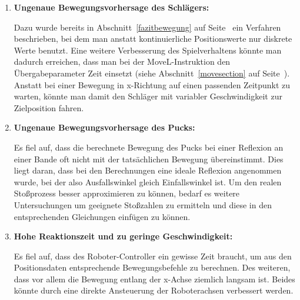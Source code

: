\begin{enumerate}
\item \textbf{Ungenaue Bewegungsvorhersage des Schlägers:} 

Dazu wurde bereits in Abschnitt~\ref{fazitbewegung} auf Seite~\pageref{fazitbewegung} ein Verfahren beschrieben, bei dem man anstatt kontinuierliche Positionswerte nur diskrete Werte benutzt. 
Eine weitere Verbesserung des Spielverhaltens könnte man dadurch erreichen, dass man bei der MoveL-Instruktion den Übergabeparameter Zeit einsetzt (siehe Abschnitt~\ref{movesection} auf Seite~\pageref{movesection}). Anstatt bei einer Bewegung in x-Richtung auf einen passenden Zeitpunkt zu warten, könnte man damit den Schläger mit variabler Geschwindigkeit zur Zielposition fahren.     
 
\item \textbf{Ungenaue Bewegungsvorhersage des Pucks:}

Es fiel auf, dass die berechnete Bewegung des Pucks bei einer Reflexion an einer Bande oft nicht mit der tatsächlichen Bewegung übereinstimmt. Dies liegt daran, dass bei den Berechnungen eine ideale Reflexion angenommen wurde, bei der also Ausfallswinkel gleich Einfallswinkel ist. Um den realen Stoßprozess besser approximieren zu können, bedarf es weitere Untersuchungen um geeignete Stoßzahlen zu ermitteln und diese in den entsprechenden Gleichungen einfügen zu können.

\item \textbf{Hohe Reaktionszeit und zu geringe Geschwindigkeit:}

Es fiel auf, dass des Roboter-Controller ein gewisse Zeit braucht, um aus den Positionsdaten entsprechende Bewegungsbefehle zu berechnen. Des weiteren, dass vor allem die Bewegung entlang der x-Achse ziemlich langsam ist. Beides könnte durch eine direkte Ansteuerung der Roboterachsen verbessert werden.   

\end{enumerate}

